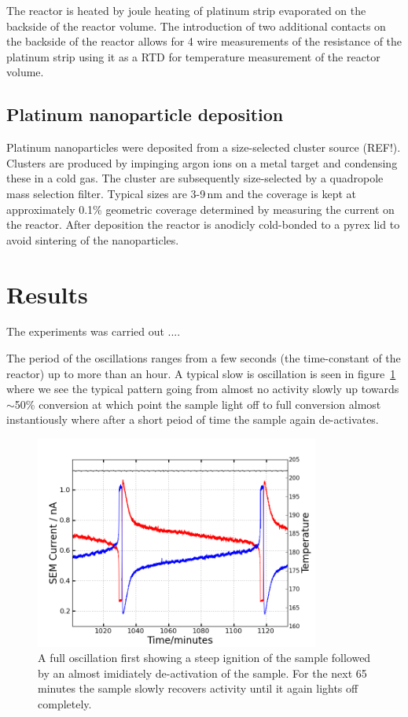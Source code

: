 \documentclass[8.5pt,twoside,twocolumn]{article}
\begin{document}
The reactor is heated by joule heating of platinum strip evaporated on the backside of the reactor volume. The introduction of two additional contacts on the backside of the reactor allows for 4 wire measurements of the resistance of the platinum strip using it as a RTD for temperature measurement of the reactor volume. 

\subsection{Platinum nanoparticle deposition}
Platinum nanoparticles were deposited from a size-selected cluster source (REF!). Clusters are produced by impinging argon ions on a metal target and condensing these in a cold gas. The cluster are subsequently size-selected by a quadropole mass selection filter. Typical sizes are 3-9\,nm and the coverage is kept at approximately 0.1\% geometric coverage determined by measuring the current on the reactor. After deposition the reactor is anodicly cold-bonded \cite{Vesborg2010} to a pyrex lid to avoid sintering of the nanoparticles.

\section{Results}
The experiments was carried out ....

The period of the oscillations ranges from a few seconds (the time-constant of the reactor) up to more than an hour. A typical slow is oscillation is seen in figure~\ref{fgr:full_oscillation} where we see the typical pattern going from almost no activity slowly up towards $\sim$50\% conversion at which point the sample light off to full conversion almost instantiously where after a short peiod of time the sample again de-activates.
\begin{figure}
  \centering
  \includegraphics[height=7cm]{single_full_oscillation.png}
  \caption{A full oscillation first showing a steep ignition of the sample followed by an almost imidiately de-activation of the sample. For the next 65\,minutes the sample slowly recovers activity until it again lights off completely.}
  \label{fgr:full_oscillation}
\end{figure}
\end{document}
